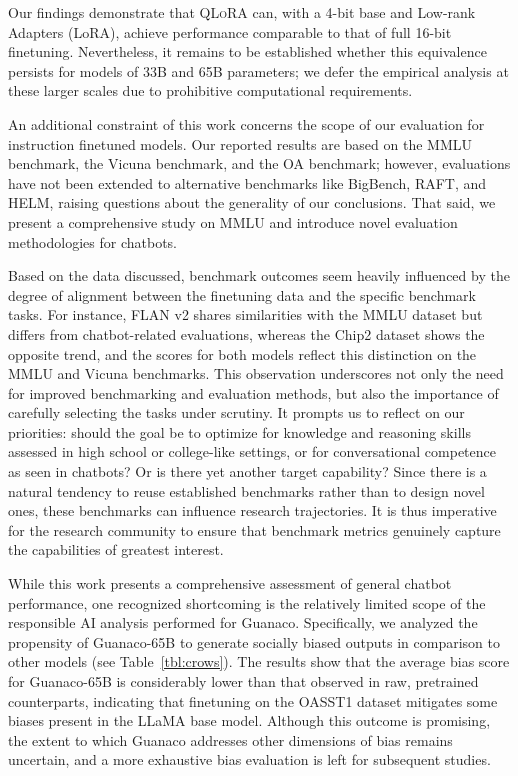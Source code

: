 Our findings demonstrate that \textsc{QLoRA} can, with a 4-bit base and Low-rank Adapters (LoRA), achieve performance comparable to that of full 16-bit finetuning. Nevertheless, it remains to be established whether this equivalence persists for models of 33B and 65B parameters; we defer the empirical analysis at these larger scales due to prohibitive computational requirements.

An additional constraint of this work concerns the scope of our evaluation for instruction finetuned models. Our reported results are based on the MMLU benchmark, the Vicuna benchmark, and the OA benchmark; however, evaluations have not been extended to alternative benchmarks like BigBench, RAFT, and HELM, raising questions about the generality of our conclusions. That said, we present a comprehensive study on MMLU and introduce novel evaluation methodologies for chatbots.

Based on the data discussed, benchmark outcomes seem heavily influenced by the degree of alignment between the finetuning data and the specific benchmark tasks. For instance, FLAN v2 shares similarities with the MMLU dataset but differs from chatbot-related evaluations, whereas the Chip2 dataset shows the opposite trend, and the scores for both models reflect this distinction on the MMLU and Vicuna benchmarks. This observation underscores not only the need for improved benchmarking and evaluation methods, but also the importance of carefully selecting the tasks under scrutiny. It prompts us to reflect on our priorities: should the goal be to optimize for knowledge and reasoning skills assessed in high school or college-like settings, or for conversational competence as seen in chatbots? Or is there yet another target capability? Since there is a natural tendency to reuse established benchmarks rather than to design novel ones, these benchmarks can influence research trajectories. It is thus imperative for the research community to ensure that benchmark metrics genuinely capture the capabilities of greatest interest.

While this work presents a comprehensive assessment of general chatbot performance, one recognized shortcoming is the relatively limited scope of the responsible AI analysis performed for {Guanaco}. Specifically, we analyzed the propensity of {Guanaco}-65B to generate socially biased outputs in comparison to other models (see Table~\ref{tbl:crows}). The results show that the average bias score for {Guanaco}-65B is considerably lower than that observed in raw, pretrained counterparts, indicating that finetuning on the OASST1 dataset mitigates some biases present in the LLaMA base model. Although this outcome is promising, the extent to which {Guanaco} addresses other dimensions of bias remains uncertain, and a more exhaustive bias evaluation is left for subsequent studies.


